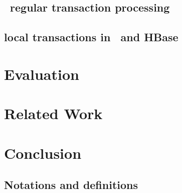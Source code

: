\documentclass[preprint]{sigplanconf-eurosys}
\begin{document}
\subsection{\sys\ regular transaction processing}

\subsection{local transactions in \sys\ and HBase}

\section{Evaluation} \label{sec:eval}



\section{Related Work} \label{sec:related}

\section{Conclusion} \label{sec:conclusions}




\newpage







\begin{appendix}
	
	\section{Notations and definitions} \label{sec:app1}


\end{appendix}
\end{document}
